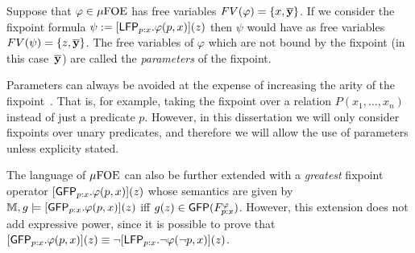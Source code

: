 \begin{remark}\label{rem:parameters}
	
	Suppose that $\varphi \in \mu\mathrm{FOE}$ has free variables $FV(\varphi) = \{x,\overline{{\mathbf{y}}}\}$. If we consider the fixpoint formula $\psi := [\mathsf{LFP}_{p{:}x}.\varphi(p,x)](z)$ then $\psi$ would have as free variables $FV(\psi) = \{z,\overline{{\mathbf{y}}}\}$. The free variables of $\varphi$ which are not bound by the fixpoint (in this case~$\overline{{\mathbf{y}}}$) are called the \emph{parameters} of the fixpoint.

	Parameters can always be avoided at the expense of increasing the arity of the fixpoint~\cite[p.~184]{Libkin2004}. That is, for example, taking the fixpoint over a relation $P(x_1,\dots,x_n)$ instead of just a predicate $p$. However, in this dissertation we will only consider fixpoints over unary predicates, and therefore we will allow the use of parameters unless explicity stated.
\end{remark}

The language of $\mu\mathrm{FOE}$ can also be further extended with a \emph{greatest} fixpoint operator $[\mathsf{GFP}_{p{:}x}.\varphi(p,x)](z)$ whose semantics are given by $\mathbb{M},g \models [\mathsf{GFP}_{p{:}x}.\varphi(p,x)](z)$ iff $g(z) \in \mathsf{GFP}(F^{\varphi}_{p{:}x})$. However, this extension does not add expressive power, since it is possible to prove that $[\mathsf{GFP}_{p{:}x}.\varphi(p,x)](z) \equiv \lnot[\mathsf{LFP}_{p{:}x}.\lnot\varphi(\lnot p,x)](z)$.
